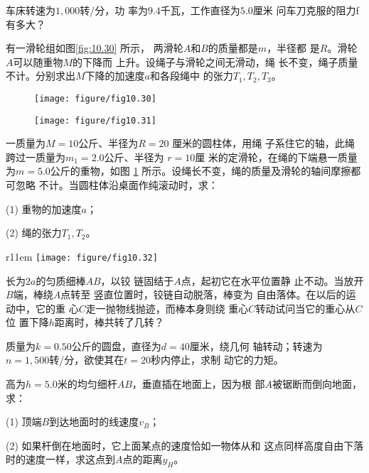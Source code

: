 \documentclass[../outline-of-mechanics.tex]{subfiles}
\begin{document}
\begin{exercises}
\exercise 车床转速为$ 1,000 $转/分，功
率为$ 9.4 $千瓦，工作直径为$ 5.0 $厘米
问车刀克服的阻力f有多大？

\exercise 有一滑轮组如图\ref{fig:10.30} 所示，
两滑轮$ A $和$ B $的质量都是$ m $，半径都
是$ R $。滑轮$ A $可以随重物$ M $的下降而
上升。设绳子与滑轮之间无滑动，绳
长不变，绳子质量不计。分别求出$ M $下降的加速度$ a $和各段绳中
的张力$ T _ { 1 } , T _ { 2 } , T _ { 3 } $。

\begin{figure}[h]
  \begin{minipage}[b]{0.4\linewidth}
    \centering
    \texttt{[image: figure/fig10.30]}
    \caption{}
    \label{fig:10.30}
  \end{minipage}
  \begin{minipage}[b]{0.6\linewidth}
    \centering
    \texttt{[image: figure/fig10.31]}
    \caption{}
    \label{fig:10.31}
  \end{minipage}
\end{figure}

\exercise 一质量为$ M = 1 0 $公斤、半径为$ R = 2 0 $ 厘米的圆柱体，用绳
子系住它的轴，此绳跨过一质量为$ m _ { 1 } = 2 . 0 $公斤、半径为 $ r = 1 0 $厘
米的定滑轮，在绳的下端悬一质量为$ m = 5 . 0 $公斤的重物，如图
\ref{fig:10.31} 所示。设绳长不变，绳的质量及滑轮的轴间摩擦都可忽略
不计。当圆柱体沿桌面作纯滚动时，求：

\clearpage
(1) 重物的加速度$ a $；

(2) 绳的张力$ T _ { 1 } , T _ { 2 } $。

\begin{wrapfigure}[8]{r}{11em}
  \vspace{-1em}
  \centering
  \texttt{[image: figure/fig10.32]}
  \caption{}
  \label{fig:10.32}
\end{wrapfigure}
\exercise 长为$ 2a $的匀质细棒$ AB $，以铰
链固结于$ A $点，起初它在水平位置静
止不动。当放开$ B $端，棒绕$ A $点转至
竖直位置时，铰链自动脱落，棒变为
自由落体。在以后的运动中，它的重
心$ C $走一抛物线抛迹，而棒本身则绕
重心$ C $转动试问当它的重心从$ C $位
置下降$ h $距离时，棒共转了几转？

\exercise 质量为$ k = 0 . 5 0$公斤的圆盘，直径为$ d = 4 0 $厘米，绕几何
轴转动；转速为$ n = 1,500 $转/分，欲使其在$ t = 2 0 $秒内停止，求制
动它的力矩。

\exercise 高为$ h = 5 . 0 $米的均匀细杆$ AB $，垂直插在地面上，因为根
部$ A $被锯断而倒向地面，求：

(1) 顶端$ B $到达地面时的线速度$ v_B $；

(2) 如果杆倒在地面时，它上面某点的速度恰如一物体从和
这点同样高度自由下落时的速度一样，求这点到$ A $点的距离$ y_H $。


\end{exercises}
\end{document}
